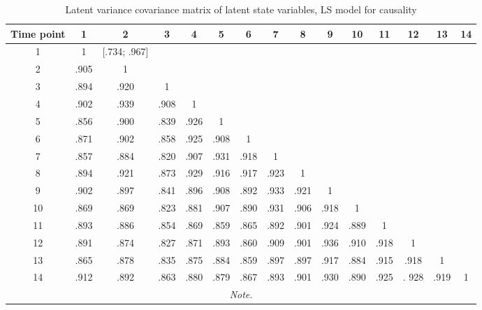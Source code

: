 \begin{table}[H]
 \setlength{\tabcolsep}{1mm}
 \begin{center}
        \caption[Correlation latent State causality]{Latent variance covariance matrix of latent state variables, LS model for causality}
        \label{Tab: correlations LS causality}
            {\footnotesize
            \begin{tabular}{ccccccccccccccc}
            \hline 
           Time point  & 1 &2&3&4&5&6&7&8&9&10&11&12&13&14 \\
           \hline
           1 &1 &[.734; .967]&&&&&&&&&&&& \\
           2 & .905&1&&&&&&&&&&&& \\
           3 & .894&.920&1&&&&&&&&&&& \\
           4 & .902&.939&.908&1&&&&&&&&&& \\
           5 & .856&.900&.839&.926&1&&&&&&&&& \\
           6 &.871& .902&.858&.925&.908&1&&&&&&&& \\
           7 & .857&.884&.820&.907&.931&.918&1&&&&&&& \\
            8 & .894&.921&.873&.929&.916&.917&.923&1&&&&&& \\
            9 & .902&.897&.841&.896&.908&.892&.933&.921&1&&&&& \\
           10 & .869&.869&.823&.881&.907&.890&.931&.906&.918&1&&&& \\
           11 &.893 & .886& .854& .869& .859& .865& .892& .901& .924& .889&	1&&& \\
           12 &.891 & .874& .827& .871& .893& .860& .909& .901&.936&.910 &.918&1&& \\
            13 & .865& .878& .835& .875& .884& .859& .897& .897& .917& .884& .915& .918& 1& \\
            14 & .912& .892& .863& .880& .879& .867& .893& .901& .930& .890& .925&. 928& .919&1 \\
 \hline 
\multicolumn{15}{p{0.65\textwidth}}{\scriptsize{\textit{Note.}}} \\
            \end{tabular}}
        \end{center}
        \end{table}

